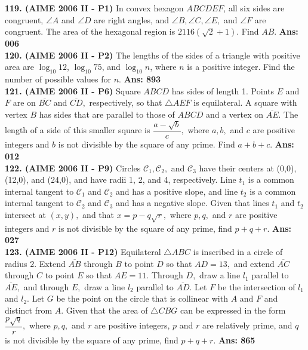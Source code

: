 \documentclass[letterpaper,10pt,addpoints]{exam}
\begin{document}
\textbf{119. (AIME 2006 II - P1) }   In convex hexagon $ABCDEF$, all six sides are congruent, $\angle A$ and $\angle D$ are right angles, and $\angle B, \angle C, \angle E,$ and $\angle F$ are congruent. The area of the hexagonal region is $2116(\sqrt{2}+1).$ Find $AB$.  \quad\textbf{Ans: 006 }\\

\textbf{120. (AIME 2006 II - P2) }   The lengths of the sides of a triangle with positive area are $\log_{10} 12$, $\log_{10} 75$, and $\log_{10} n$, where $n$ is a positive integer. Find the number of possible values for $n$.  \quad\textbf{Ans: 893}\\

\textbf{121. (AIME 2006 II - P6) }  Square $ABCD$ has sides of length 1. Points $E$ and $F$ are on $\overline{BC}$ and $\overline{CD},$ respectively, so that $\triangle AEF$ is equilateral. A square with vertex $B$ has sides that are parallel to those of $ABCD$ and a vertex on $\overline{AE}.$ The length of a side of this smaller square is $\dfrac{a-\sqrt{b}}{c},$ where $a, b,$ and $c$ are positive integers and $b$ is not divisible by the square of any prime. Find $a+b+c.$  \quad\textbf{Ans: 012}\\

\textbf{122. (AIME 2006 II - P9) }   Circles $\mathcal{C}_1, \mathcal{C}_2,$ and $\mathcal{C}_3$ have their centers at (0,0), (12,0), and (24,0), and have radii 1, 2, and 4, respectively. Line $t_1$ is a common internal tangent to $\mathcal{C}_1$ and $\mathcal{C}_2$ and has a positive slope, and line $t_2$ is a common internal tangent to $\mathcal{C}_2$ and $\mathcal{C}_3$ and has a negative slope. Given that lines $t_1$ and $t_2$ intersect at $(x,y),$ and that $x=p-q\sqrt{r},$ where $p, q,$ and $r$ are positive integers and $r$ is not divisible by the square of any prime, find $p+q+r.$  \quad\textbf{Ans: 027}\\

\textbf{123. (AIME 2006 II - P12) }   Equilateral $\triangle ABC$ is inscribed in a circle of radius $2$. Extend $\overline{AB}$ through $B$ to point $D$ so that $AD=13,$ and extend $\overline{AC}$ through $C$ to point $E$ so that $AE = 11.$ Through $D,$ draw a line $l_1$ parallel to $\overline{AE},$ and through $E,$ draw a line $l_2$ parallel to $\overline{AD}.$ Let $F$ be the intersection of $l_1$ and $l_2.$ Let $G$ be the point on the circle that is collinear with $A$ and $F$ and distinct from $A.$ Given that the area of $\triangle CBG$ can be expressed in the form $\dfrac{p\sqrt{q}}{r},$ where $p, q,$ and $r$ are positive integers, $p$ and $r$ are relatively prime, and $q$ is not divisible by the square of any prime, find $p+q+r.$  \quad\textbf{Ans: 865}\\
\end{document}
